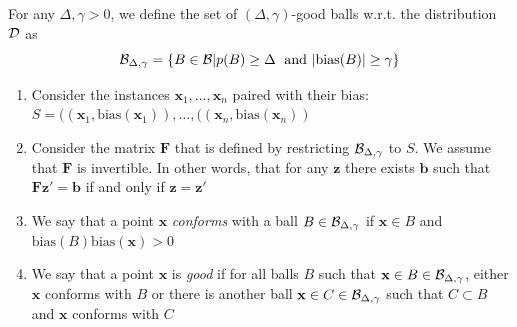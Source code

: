 \documentclass{article}
\newcommand{\D}{{\cal D}}
\newcommand{\B}{{\cal B}}
\newcommand{\vF}{\mathbf{F}}
\newcommand{\vx}{\mathbf{x}}
\newcommand{\vb}{\mathbf{b}}
\newcommand{\vz}{\mathbf{z}}
\newcommand{\bias}{\text{bias}}
\begin{document}
For any $\Delta,\gamma>0$, we define the set of $(\Delta,\gamma)$-good balls w.r.t. the
distribution $\D$ as
\[
\B_{\Delta,\gamma} = \left\{ B \in \B | p(B) \geq \Delta\;\mbox{ and }
|\bias(B)|\geq \gamma \right\}
\]
\begin{enumerate}
  \item
Consider the instances $\vx_1,\ldots,\vx_n$ paired with their bias:
$S=((\vx_1,\bias(\vx_1)),\ldots,((\vx_n,\bias(\vx_n))$
\item
Consider the matrix $\vF$ that is defined by restricting
$\B_{\Delta,\gamma}$ to $S$. We assume that $\vF$ is invertible. In
other words, that for any $\vz$ there exists $\vb$ such that $\vF \vz'
= \vb$ if and only if $\vz=\vz'$
\item
We say that a point $\vx$ {\em conforms} with a ball $B \in
\B_{\Delta,\gamma}$ if $\vx \in  B$ and $\bias(B) \bias(\vx)>0$
\item
We say that a point $\vx$ is {\em good} if for all balls $B$ such that $\vx
\in B \in \B_{\Delta,\gamma}$, either $\vx$ conforms with $B$ or there
is another ball $\vx \in C \in \B_{\Delta,\gamma}$ such that $C
\subset B$ and $\vx$ conforms with $C$
\end{enumerate}
\end{document}
